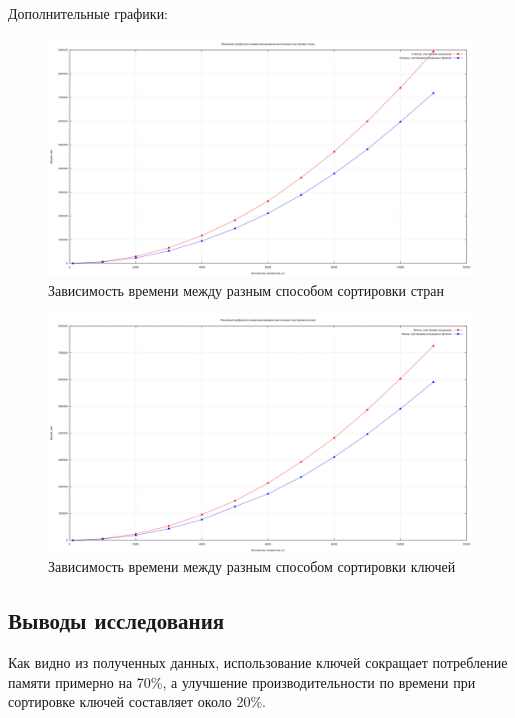 Дополнительные графики:
\begin{figure}[H]
	\centering
	\includegraphics[width=1\textwidth]{img/linear_time_together_countries.jpg}
	\captionsetup{font=footnotesize}
	\caption{Зависимость времени между разным способом сортировки стран}
	\label{fig:03}
\end{figure}

\begin{figure}[H]
	\centering
	\includegraphics[width=1\textwidth]{img/linear_time_together_keys.jpg}
	\captionsetup{font=footnotesize}
	\caption{Зависимость времени между разным способом сортировки ключей}
	\label{fig:04}
\end{figure}

\subsection{Выводы исследования}
Как видно из полученных данных, использование ключей сокращает потребление памяти примерно на 70\%, а улучшение производительности по времени при сортировке ключей составляет около 20\%.
